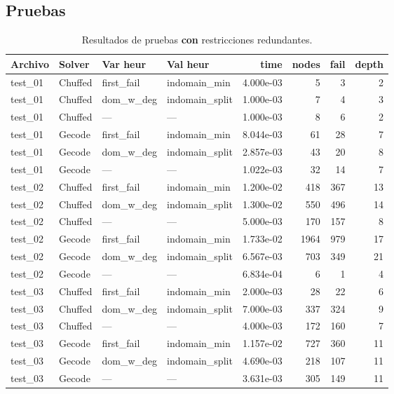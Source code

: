 
\subsection{Pruebas}\label{sec:01-sudoku-pruebas}
\begin{compactfloats}
\begin{table}[H]
  \centering
  \small
  \setlength{\tabcolsep}{2.8pt}
  \caption{Resultados de pruebas \textbf{con} restricciones redundantes.}
  \label{tab:pruebas-sudoku-on}
  \begin{tabular}{l l l l r r r r}
    \toprule
    \textbf{Archivo} & \textbf{Solver} & \textbf{Var heur} & \textbf{Val heur} & \textbf{time} & \textbf{nodes} & \textbf{fail} & \textbf{depth} \\
    \midrule
    test\_01 & Chuffed & first\_fail  & indomain\_min   & 4.000e-03 & 5   & 3   & 2 \\
    test\_01 & Chuffed & dom\_w\_deg  & indomain\_split & 1.000e-03 & 7   & 4   & 3 \\
    test\_01 & Chuffed & ---          & ---              & 1.000e-03 & 8   & 6   & 2 \\
    test\_01 & Gecode  & first\_fail  & indomain\_min   & 8.044e-03 & 61  & 28  & 7 \\
    test\_01 & Gecode  & dom\_w\_deg  & indomain\_split & 2.857e-03 & 43  & 20  & 8 \\
    test\_01 & Gecode  & ---          & ---              & 1.022e-03 & 32  & 14  & 7 \\
    \midrule
    test\_02 & Chuffed & first\_fail  & indomain\_min   & 1.200e-02 & 418 & 367 & 13 \\
    test\_02 & Chuffed & dom\_w\_deg  & indomain\_split & 1.300e-02 & 550 & 496 & 14 \\
    test\_02 & Chuffed & ---          & ---              & 5.000e-03 & 170 & 157 & 8 \\
    test\_02 & Gecode  & first\_fail  & indomain\_min   & 1.733e-02 & 1964 & 979 & 17 \\
    test\_02 & Gecode  & dom\_w\_deg  & indomain\_split & 6.567e-03 & 703  & 349 & 21 \\
    test\_02 & Gecode  & ---          & ---              & 6.834e-04 & 6    & 1   & 4 \\
    \midrule
    test\_03 & Chuffed & first\_fail  & indomain\_min   & 2.000e-03 & 28  & 22  & 6 \\
    test\_03 & Chuffed & dom\_w\_deg  & indomain\_split & 7.000e-03 & 337 & 324 & 9 \\
    test\_03 & Chuffed & ---          & ---              & 4.000e-03 & 172 & 160 & 7 \\
    test\_03 & Gecode  & first\_fail  & indomain\_min   & 1.157e-02 & 727 & 360 & 11 \\
    test\_03 & Gecode  & dom\_w\_deg  & indomain\_split & 4.690e-03 & 218 & 107 & 11 \\
    test\_03 & Gecode  & ---          & ---              & 3.631e-03 & 305 & 149 & 11 \\
    \bottomrule
  \end{tabular}
\end{table}


\end{compactfloats}
